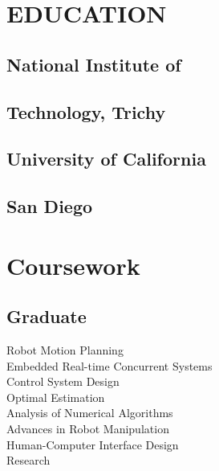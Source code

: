 \documentclass[]{deedy-resume-openfont}
\begin{document}
%
%
\lastupdated
%
%
\smaller
{}

%
%

\begin{minipage}[t]{0.33\textwidth} 


\section{EDUCATION}
\subsection{National Institute of} \subsection{Technology, Trichy }

\sectionsep

\subsection{University of California} \subsection{San Diego} 


\section{Coursework}

\subsection{Graduate}
Robot Motion Planning\\
Embedded Real-time Concurrent Systems\\
Control System Design\\
Optimal Estimation\\
Analysis of Numerical Algorithms\\
Advances in Robot Manipulation\\
Human-Computer Interface Design \\ Research\\


\end{minipage}
\end{document}

